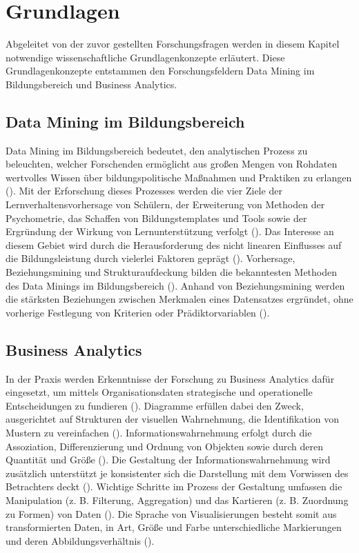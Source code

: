 \chapter[Grundlagen]{Grundlagen}
\label{chap:literature}

Abgeleitet von der zuvor gestellten Forschungsfragen werden in diesem Kapitel notwendige wissenschaftliche Grundlagenkonzepte erläutert.
Diese Grundlagenkonzepte entstammen den Forschungsfeldern Data Mining im Bildungsbereich und Business Analytics.

\section[Data Mining im Bildungsbereich]{Data Mining im Bildungsbereich}

Data Mining im Bildungsbereich bedeutet, den analytischen Prozess zu beleuchten, welcher Forschenden ermöglicht aus großen Mengen von Rohdaten wertvolles Wissen über bildungspolitische Maßnahmen und Praktiken zu erlangen (\cite[S. 1]{Gamazo.2020}).
Mit der Erforschung dieses Prozesses werden die vier Ziele der Lernverhaltensvorhersage von Schülern, der Erweiterung von Methoden der Psychometrie, das Schaffen von Bildungstemplates und Tools sowie der Ergründung der Wirkung von Lernunterstützung verfolgt (\cite[S. 2]{P.Bachhal.2021}).
Das Interesse an diesem Gebiet wird durch die Herausforderung des nicht linearen Einflusses auf die Bildungsleistung durch vielerlei Faktoren geprägt (\cite[S. 1]{Khan.2021}).
Vorhersage, Beziehungsmining und Strukturaufdeckung bilden die bekanntesten Methoden des Data Minings im Bildungsbereich (\cite[S. 3]{Gamazo.2020}).
Anhand von Beziehungsmining werden die stärksten Beziehungen zwischen Merkmalen eines Datensatzes ergründet, ohne vorherige Festlegung von Kriterien oder Prädiktorvariablen (\cite[S. 3]{Gamazo.2020}).

\section[Business Analytics]{Business Analytics}

In der Praxis werden Erkenntnisse der Forschung zu Business Analytics dafür eingesetzt, um mittels Organisationsdaten strategische und operationelle Entscheidungen zu fundieren (\cite[S. 1]{Qin.2020}).
Diagramme erfüllen dabei den Zweck, ausgerichtet auf Strukturen der visuellen Wahrnehmung, die Identifikation von Mustern zu vereinfachen (\cite[S. 287]{Baars2021}).
Informationswahrnehmung erfolgt durch die Assoziation, Differenzierung und Ordnung von Objekten sowie durch deren Quantität und Größe (\cite[S. 287]{Baars2021}).
Die Gestaltung der Informationswahrnehmung wird zusätzlich unterstützt je konsistenter sich die Darstellung mit dem Vorwissen des Betrachters deckt (\cite[S. 288]{Baars2021}).
Wichtige Schritte im Prozess der Gestaltung umfassen die Manipulation (z. B. Filterung, Aggregation) und das Kartieren (z. B. Zuordnung zu Formen) von Daten (\cite[S. 2]{Qin.2020}).
Die Sprache von Visualisierungen besteht somit aus transformierten Daten, in Art, Größe und Farbe unterschiedliche Markierungen und deren Abbildungsverhältnis (\cite[S. 3]{Qin.2020}).